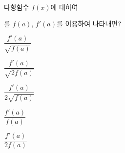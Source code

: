 다항함수 $f(x)$에 대하여 \par\smallskip{}\par\smallskip\noindent 를 $f(a)$, $f'(a)$를 이용하여 나타내면? 
\begin{choices32}{\rule[-3ex]{0pt}{8ex}$\dfrac{f'(a)}{\sqrt{f(a)}}$}{\rule[-3ex]{0pt}{8ex}$\dfrac{f'(a)}{\sqrt{2f(a)}}$}{\rule[-3ex]{0pt}{8ex}$\dfrac{f'(a)}{2\sqrt{f(a)}}$}{\rule[-3ex]{0pt}{8ex}$\dfrac{f'(a)}{f(a)}$}{\rule[-3ex]{0pt}{8ex}$\dfrac{f'(a)}{2f(a)}$}\end{choices32}
